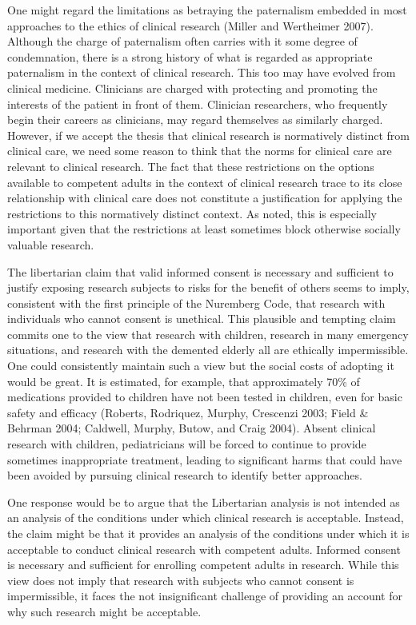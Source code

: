 \documentclass[12p]{article}
\begin{document}
One might regard the limitations as betraying the paternalism embedded in most approaches to the ethics of clinical research (Miller and Wertheimer 2007). Although the charge of paternalism often carries with it some degree of condemnation, there is a strong history of what is regarded as appropriate paternalism in the context of clinical research. This too may have evolved from clinical medicine. Clinicians are charged with protecting and promoting the interests of the patient in front of them. Clinician researchers, who frequently begin their careers as clinicians, may regard themselves as similarly charged. However, if we accept the thesis that clinical research is normatively distinct from clinical care, we need some reason to think that the norms for clinical care are relevant to clinical research. The fact that these restrictions on the options available to competent adults in the context of clinical research trace to its close relationship with clinical care does not constitute a justification for applying the restrictions to this normatively distinct context. As noted, this is especially important given that the restrictions at least sometimes block otherwise socially valuable research.

The libertarian claim that valid informed consent is necessary and sufficient to justify exposing research subjects to risks for the benefit of others seems to imply, consistent with the first principle of the Nuremberg Code, that research with individuals who cannot consent is unethical. This plausible and tempting claim commits one to the view that research with children, research in many emergency situations, and research with the demented elderly all are ethically impermissible. One could consistently maintain such a view but the social costs of adopting it would be great. It is estimated, for example, that approximately 70\% of medications provided to children have not been tested in children, even for basic safety and efficacy (Roberts, Rodriquez, Murphy, Crescenzi 2003; Field & Behrman 2004; Caldwell, Murphy, Butow, and Craig 2004). Absent clinical research with children, pediatricians will be forced to continue to provide sometimes inappropriate treatment, leading to significant harms that could have been avoided by pursuing clinical research to identify better approaches.

One response would be to argue that the Libertarian analysis is not intended as an analysis of the conditions under which clinical research is acceptable. Instead, the claim might be that it provides an analysis of the conditions under which it is acceptable to conduct clinical research with competent adults. Informed consent is necessary and sufficient for enrolling competent adults in research. While this view does not imply that research with subjects who cannot consent is impermissible, it faces the not insignificant challenge of providing an account for why such research might be acceptable.
\end{document}
